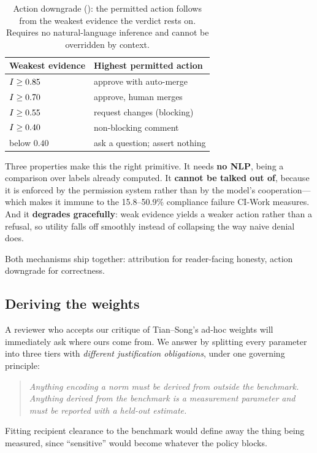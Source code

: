 \begin{table}[t]
\centering
\caption{Action downgrade (): the permitted action follows
from the weakest evidence the verdict rests on. Requires no
natural-language inference and cannot be overridden by context.}
\label{tab:downgrade}
\footnotesize
\begin{tabular}{@{}lp{}@{}}
\toprule
\textbf{Weakest evidence} & \textbf{Highest permitted action} \\
\midrule
$I \ge 0.85$ & approve with auto-merge \\
$I \ge 0.70$ & approve, human merges \\
$I \ge 0.55$ & request changes (blocking) \\
$I \ge 0.40$ & non-blocking comment \\
below $0.40$   & ask a question; assert nothing \\
\bottomrule
\end{tabular}
\end{table}

Three properties make this the right primitive. It needs \textbf{no NLP}, being
a comparison over labels already computed. It \textbf{cannot be talked out of},
because it is enforced by the permission system rather than by the model's
cooperation---which makes it immune to the 15.8--50.9\% compliance failure
CI-Work measures. And it \textbf{degrades gracefully}: weak evidence yields a
weaker action rather than a refusal, so utility falls off smoothly instead of
collapsing the way naive denial does.

Both mechanisms ship together: attribution for reader-facing honesty, action
downgrade for correctness.

\subsection{Deriving the weights}
\label{sec:method:weights}

A reviewer who accepts our critique of Tian--Song's ad-hoc weights will
immediately ask where ours come from. We answer by splitting every parameter
into three tiers with \emph{different justification obligations}, under one
governing principle:
\begin{quote}
\emph{Anything encoding a norm must be derived from outside the benchmark.
Anything derived from the benchmark is a measurement parameter and must be
reported with a held-out estimate.}
\end{quote}
Fitting recipient clearance to the benchmark would define away the thing being
measured, since ``sensitive'' would become whatever the policy blocks.

